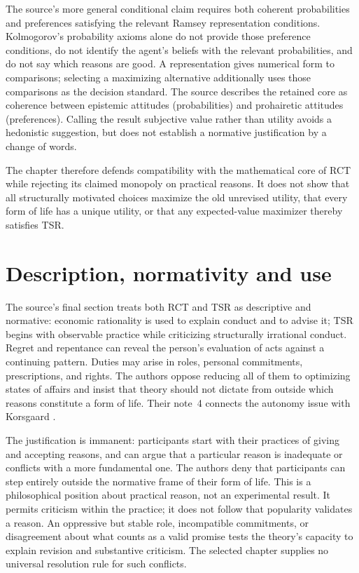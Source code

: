The source's more general conditional claim requires both coherent
probabilities and preferences satisfying the relevant Ramsey
representation conditions. Kolmogorov's probability axioms alone do
not provide those preference conditions, do not identify the agent's
beliefs with the relevant probabilities, and do not say which reasons
are good. A representation gives numerical form to comparisons;
selecting a maximizing alternative additionally uses those comparisons
as the decision standard. The source describes the retained core as
coherence between epistemic attitudes (probabilities) and prohairetic
attitudes (preferences). Calling the result subjective value rather
than utility avoids a hedonistic suggestion, but does not establish a
normative justification by a change of words.

The chapter therefore defends compatibility with the mathematical core
of RCT while rejecting its claimed monopoly on practical reasons. It
does not show that all structurally motivated choices maximize the old
unrevised utility, that every form of life has a unique utility, or that
any expected-value maximizer thereby satisfies TSR.

\section{Description, normativity and use}
\label{sec:p11-rat105-use}

The source's final section treats both RCT and TSR as descriptive and
normative: economic rationality is used to explain conduct and to advise
it; TSR begins with observable practice while criticizing structurally
irrational conduct. Regret and repentance can reveal the person's
evaluation of acts against a continuing pattern. Duties may arise in
roles, personal commitments, prescriptions, and rights. The authors
oppose reducing all of them to optimizing states of affairs and insist
that theory should not dictate from outside which reasons constitute a
form of life. Their note~4 connects the autonomy issue with Korsgaard
\parencite[p.~630 and nn.~1--4]{NidaRumelinGutwaldZuber2021}.

The justification is immanent: participants start with their practices
of giving and accepting reasons, and can argue that a particular reason
is inadequate or conflicts with a more fundamental one. The authors
deny that participants can step entirely outside the normative frame of
their form of life. This is a philosophical position about practical
reason, not an experimental result. It permits criticism within the
practice; it does not follow that popularity validates a reason. An
oppressive but stable role, incompatible commitments, or disagreement
about what counts as a valid promise tests the theory's capacity to
explain revision and substantive criticism. The selected chapter supplies
no universal resolution rule for such conflicts.

